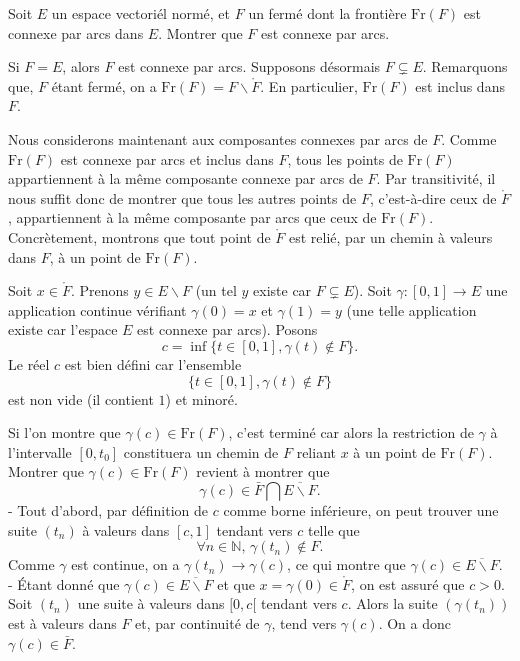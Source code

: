 \begin{question}{}{}
Soit $E$ un espace vectoriél normé, et $F$ un fermé dont la frontière $\text{Fr}(F)$ est connexe par arcs dans $E$. Montrer que $F$ est connexe par arcs.
\end{question}

\begin{myproof}{}{}
Si $F=E$, alors $F$ est connexe par arcs. Supposons désormais $F \subsetneq E$.
Remarquons que, $F$ étant fermé, on a $\text{Fr}(F) = F \backslash \mathring{F}$. En particulier, $\text{Fr}(F)$ est inclus dans $F$.

Nous considerons maintenant aux composantes connexes par arcs de $F$. Comme $\text{Fr}(F)$ est connexe par arcs et inclus dans $F$, tous les points de $\text{Fr}(F)$ appartiennent à la même composante connexe par arcs de $F$. Par transitivité, il nous suffit donc de montrer que tous les autres points de $F$, c'est-à-dire ceux de $\mathring{F}$, appartiennent à la même composante par arcs que ceux de $\text{Fr}(F)$. Concrètement, montrons que tout point de $\mathring{F}$ est relié, par un chemin à valeurs dans $F$, à un point de $\text{Fr}(F)$.

Soit $x\in\mathring{F}$. Prenons $y\in E\backslash F$ (un tel $y$ existe car $F \subsetneq E$). Soit $\gamma:[0,1]\to E$ une application continue vérifiant $\gamma(0)=x$ et $\gamma(1)=y$ (une telle application existe car l'espace $E$ est connexe par arcs). Posons 
$$c=\inf\{t\in[0,1],\gamma(t)\notin F\}.$$
Le réel $c$ est bien défini car l'ensemble
$$\{t\in[0,1], \gamma(t)\notin F\}$$
est non vide (il contient $1$) et minoré.

Si l'on montre que $\gamma(c)\in\text{Fr}(F)$, c'est terminé car alors la restriction de $\gamma$ à l'intervalle $[0,t_0]$ constituera un chemin de $F$ reliant $x$ à un point de $\text{Fr}(F)$. Montrer que $\gamma(c)\in\text{Fr}(F)$ revient à montrer que
$$\gamma(c)\in\bar{F}\bigcap\overline{E\backslash F}.$$
- Tout d'abord, par définition de $c$ comme borne inférieure, on peut trouver une suite $(t_n)$ à valeurs dans $[c,1]$ tendant vers $c$ telle que $$\forall n\in \mathbb{N},\, \gamma(t_n)\notin F.$$ Comme $\gamma$ est continue, on a $\gamma(t_n)\to\gamma(c)$, ce qui montre que $\gamma(c)\in \overline{E\backslash F}$.
- Étant donné que $\gamma(c)\in \overline{E\backslash F}$ et que $x=\gamma(0)\in \mathring{F}$, on est assuré que $c>0$. Soit $(t_n)$ une suite à valeurs dans $[0,c[$ tendant vers $c$. Alors la suite $(\gamma(t_n))$ est à valeurs dans $F$ et, par continuité de $\gamma$, tend vers $\gamma(c)$. On a donc $\gamma(c)\in\bar{F}$.
\end{myproof}





